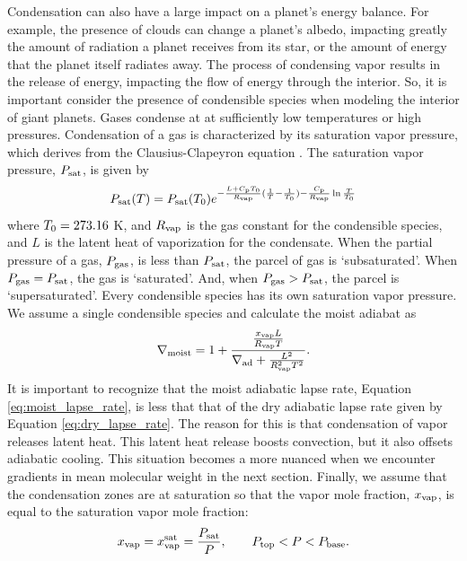 \documentclass[11pt]{ucscthesisbs}
\begin{document}
Condensation can also have a large impact on a planet's energy balance. For example, the presence of clouds can change a planet's albedo, impacting greatly the amount of radiation a planet receives from its star, or the amount of energy that the planet itself radiates away. The process of condensing vapor results in the release of energy, impacting the flow of energy through the interior. So, it is important consider the presence of condensible species when modeling the interior of giant planets. Gases condense at at sufficiently low temperatures or high pressures. Condensation of a gas is characterized by its saturation vapor pressure, which derives from the Clausius-Clapeyron equation \citep{sanchez_2011}. The saturation vapor pressure, $P_{\rm sat}$, is given by 
\begin{equation}
  P_{\rm sat}(T) = P_{\rm sat}(T_{\rm 0})e^{-\frac{L + C_{\rm p}T_{\rm 0}}{R_{\rm vap}}(\frac{1}{T} - \frac{1}{T_{\rm 0}}) -\frac{C_{\rm p}}{R_{\rm vap}}\ln{\frac{T}{T_{\rm 0}}}}
  \label{eq:saturation_vapor_pressure}
\end{equation}{}
where $T_{\rm 0} = 273.16$ K, and $R_{\rm vap}$ is the gas constant for the condensible species, and $L$ is the latent heat of vaporization for the condensate. When the partial pressure of a gas, $P_{\rm gas}$, is less than $P_{\rm sat}$, the parcel of gas is `subsaturated'. When $P_{\rm gas} = P_{\rm sat}$, the gas is `saturated'. And, when $P_{\rm gas} > P_{\rm sat}$, the parcel is `supersaturated'. Every condensible species has its own saturation vapor pressure. We assume a single condensible species and calculate the moist adiabat as \citep{sanchez_2011} 
\begin{equation}
  \nabla_{\rm moist} = 1 + \frac{\frac{x_{\rm vap} L}{R_{\rm vap}T}}{\nabla_{\rm ad} + \frac{L^2}{R_{\rm vap}^2 T^2}}.
  \label{eq:moist_lapse_rate}
\end{equation}
It is important to recognize that the moist adiabatic lapse rate, Equation \ref{eq:moist_lapse_rate}, is less that that of the dry adiabatic lapse rate given by Equation \ref{eq:dry_lapse_rate}. The reason for this is that condensation of vapor releases latent heat. This latent heat release boosts convection, but it also offsets adiabatic cooling. This situation becomes a more nuanced when we encounter gradients in mean molecular weight in the next section. Finally, we assume that the condensation zones are at saturation so that the vapor mole fraction, $x_{\rm vap}$, is equal to the saturation vapor mole fraction:
\begin{equation}
x_{\rm vap} = x_{\rm vap}^{\rm sat} = \frac{P_{\rm sat}}{P}, \qquad P_{\rm top} < P < P_{\rm base}.
\end{equation}
\end{document}
